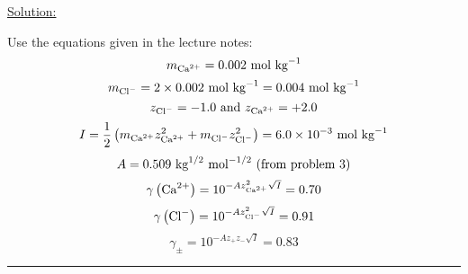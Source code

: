 \noindent
\underline{Solution:}

Use the equations given in the lecture notes:
$$m_{\textnormal{Ca}^{2+}} = 0.002\textnormal{ mol kg}^{-1}$$
$$m_{\textnormal{Cl}^-} = 2\times 0.002\textnormal{ mol kg}^{-1} = 0.004\textnormal{ mol kg}^{-1}$$
$$z_{\textnormal{Cl}^{-}} = -1.0\textnormal{ and }z_{\textnormal{Ca}^{2+}} = +2.0$$
$$I = \frac{1}{2}\left(m_{\textnormal{Ca}^{2+}}z_{\textnormal{Ca}^{2+}}^2 + m_{\textnormal{Cl}^-}z_{\textnormal{Cl}^-}^{2}\right) = 6.0\times 10^{-3}\textnormal{ mol kg}^{-1}$$
$$A = 0.509\textnormal{ kg}^{1/2}\textnormal{ mol}^{-1/2}\textnormal{ (from problem 3)}$$
$$\gamma\left(\textnormal{Ca}^{2+}\right) = 10^{-Az_{\textnormal{Ca}^{2+}}^2\sqrt{I}} = 0.70$$
$$\gamma\left(\textnormal{Cl}^-\right) = 10^{-Az_{\textnormal{Cl}^{-}}^2\sqrt{I}} = 0.91$$
$$\gamma_\pm = 10^{-Az_+z_-\sqrt{I}} = 0.83$$

\hrule\vspace{0.5cm}
